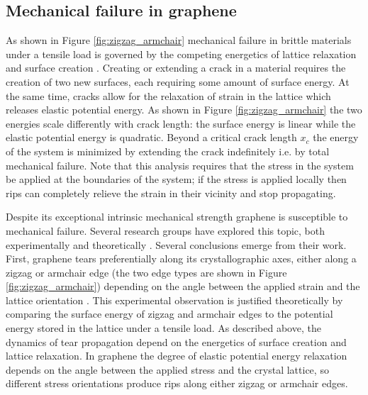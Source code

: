 \documentclass[edeposit,fullpage,draftthesis]{uiucthesis2009}
\begin{document}
        
        \subsection{Mechanical failure in graphene}
        
        As shown in Figure \ref{fig:zigzag_armchair} mechanical failure in brittle materials under a tensile load is 
        governed by the competing energetics of lattice relaxation
        and surface creation \cite{griffith1921phenomena}. Creating or extending a crack in a material 
        requires the creation of two new surfaces, each requiring some amount of surface energy. 
        At the same time, cracks allow for the relaxation of strain in the lattice which releases elastic potential energy. 
        As shown in Figure \ref{fig:zigzag_armchair} the two energies scale differently with crack length:
        the surface energy is linear while the elastic potential energy is quadratic.
        Beyond a critical crack length $x_c$ the energy of the system is minimized by extending the crack indefinitely
        i.e. by total mechanical failure. 
        Note that this analysis requires that the stress in the system be applied at the boundaries of the 
        system; if the stress is applied locally then rips can completely relieve the strain in their vicinity
        and stop propagating.
        
        Despite its exceptional intrinsic mechanical strength graphene is susceptible to mechanical failure.
        Several research groups have explored this topic, both experimentally
        \cite{huang2011grains, ruiz2011softened, lee2013high} and theoretically 
        \cite{zhao2010temperature, wang2012effect, terdalkar2010nanoscale}.
        Several conclusions emerge from their work. First, graphene tears preferentially along its 
        crystallographic axes, either along a zigzag or armchair edge (the two edge types are shown
        in Figure \ref{fig:zigzag_armchair}) depending
        on the angle between the applied strain and the lattice orientation \cite{kim2011ripping}. 
        This experimental observation is justified theoretically by comparing the surface
        energy of zigzag and armchair edges to the potential energy stored in the lattice under a tensile load.
        As described above, the dynamics of tear propagation depend on the energetics of surface creation
        and lattice relaxation. 
        In graphene the degree of elastic potential energy relaxation depends on the angle between the applied stress and
        the crystal lattice, so different stress orientations produce rips along either zigzag or armchair edges.
        
\end{document}
